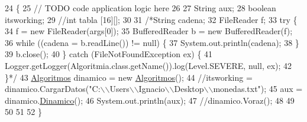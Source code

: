 \begin{DoxyCode}
24                                                               \{
25         \textcolor{comment}{// TODO code application logic here}
26         
27         String aux;
28         \textcolor{keywordtype}{boolean} itsworking;
29         \textcolor{comment}{//int tabla [16][];}
30         
31         \textcolor{comment}{/*String cadena;}
32 \textcolor{comment}{        FileReader f;}
33 \textcolor{comment}{        try \{}
34 \textcolor{comment}{            f = new FileReader(args[0]);}
35 \textcolor{comment}{            BufferedReader b = new BufferedReader(f);}
36 \textcolor{comment}{            while ((cadena = b.readLine()) != null) \{}
37 \textcolor{comment}{                System.out.println(cadena);}
38 \textcolor{comment}{            \}}
39 \textcolor{comment}{            b.close();}
40 \textcolor{comment}{        \} catch (FileNotFoundException ex) \{}
41 \textcolor{comment}{            Logger.getLogger(Algoritmia.class.getName()).log(Level.SEVERE, null, ex);}
42 \textcolor{comment}{        \}*/}
43         \mbox{\hyperlink{classalgoritmia_1_1_algoritmos}{Algoritmos}} dinamico = \textcolor{keyword}{new} \mbox{\hyperlink{classalgoritmia_1_1_algoritmos}{Algoritmos}}();
44         \textcolor{comment}{//itsworking = dinamico.CargarDatos("C:\(\backslash\)\(\backslash\)Users\(\backslash\)\(\backslash\)Ignacio\(\backslash\)\(\backslash\)Desktop\(\backslash\)\(\backslash\)monedas.txt");}
45         aux = dinamico.\mbox{\hyperlink{classalgoritmia_1_1_algoritmos_a673473cfeaecd827c7345fb929e19464}{Dinamico}}();
46         System.out.println(aux);
47         \textcolor{comment}{//dinamico.Voraz();}
48         
49         
50         
51         
52     \}
\end{DoxyCode}
